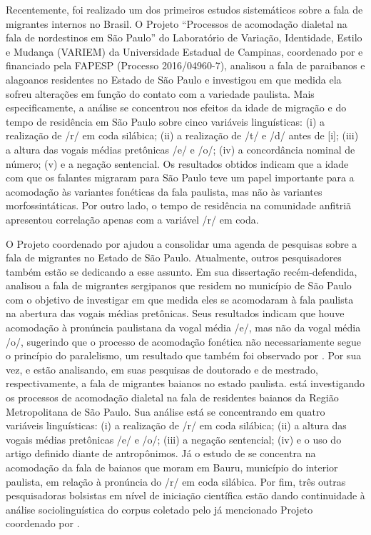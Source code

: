\documentclass[
			a4paper,		%
			12pt,			%
			oneside,
			]{article}		%
\begin{document}
Recentemente, foi realizado um dos primeiros estudos sistemáticos sobre a fala de 
migrantes internos no Brasil. O Projeto “Processos de acomodação dialetal na fala de 
nordestinos em São Paulo” do Laboratório de Variação, Identidade, Estilo e Mudança 
(VARIEM) da Universidade Estadual de Campinas, coordenado por \citep{Oushiro2018} e 
financiado pela FAPESP (Processo 2016/04960-7), analisou a fala de paraibanos e alagoanos 
residentes no Estado de São Paulo e investigou em que medida ela sofreu alterações em 
função do contato com a variedade paulista. Mais especificamente, a análise se concentrou 
nos efeitos da idade de migração e do tempo de residência em São Paulo sobre cinco 
variáveis linguísticas: (i) a realização de /r/ em coda silábica; (ii) a realização de 
/t/ e /d/ antes de [i]; (iii) a altura das vogais médias pretônicas /e/ e /o/; (iv) a 
concordância nominal de número; (v) e a negação sentencial. Os resultados obtidos indicam 
que a idade com que os falantes migraram para São Paulo teve um papel importante para a 
acomodação às variantes fonéticas da fala paulista, mas não às variantes 
morfossintáticas. Por outro lado, o tempo de residência na comunidade anfitriã apresentou 
correlação apenas com a variável /r/ em coda.

O Projeto coordenado por \citep{Oushiro2018} ajudou a consolidar uma agenda de pesquisas 
sobre 
a fala de migrantes no Estado de São Paulo. Atualmente, outros pesquisadores também estão 
se dedicando a esse assunto. Em sua dissertação recém-defendida, \citet{Santana2019} 
analisou 
a fala de migrantes sergipanos que residem no município de São Paulo com o objetivo de 
investigar em que medida eles se acomodaram à fala paulista na abertura das vogais médias 
pretônicas. Seus resultados indicam que houve acomodação à pronúncia paulistana da vogal 
média /e/, mas não da vogal média /o/, sugerindo que o processo de acomodação fonética 
não necessariamente segue o princípio do paralelismo, um resultado que também foi 
observado por \citet{Oushiro2019}. Por sua vez, \citet{Souza2017} e \citet{Oliveira2019} 
estão analisando, em suas pesquisas de doutorado e de mestrado, respectivamente, a fala 
de migrantes baianos no estado paulista. \citet{Souza2017} está investigando os processos 
de acomodação dialetal na fala de residentes baianos da Região Metropolitana de São 
Paulo. Sua análise está se concentrando em quatro variáveis linguísticas: (i) a 
realização de /r/ em coda silábica; (ii) a altura das vogais médias pretônicas /e/ e /o/; 
(iii) a negação sentencial; (iv) e o uso do artigo definido diante de antropônimos. Já o 
estudo de \citet{Oliveira2019} se concentra na acomodação da fala de baianos que moram em 
Bauru, município do interior paulista, em relação à pronúncia do /r/ em coda silábica. 
Por fim, três outras pesquisadoras bolsistas em nível de iniciação científica estão dando 
continuidade à análise sociolinguística do corpus coletado pelo já mencionado Projeto 
coordenado por \citet{Oushiro2018}.
\end{document}
